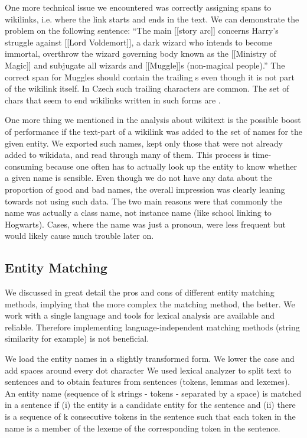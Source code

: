 One more technical issue we encountered was correctly assigning spans to wikilinks, i.e. where the link starts and ends in the text. We can demonstrate the problem on the following sentence: “The main [[story arc]] concerns Harry's struggle against [[Lord Voldemort]], a dark wizard who intends to become immortal, overthrow the wizard governing body known as the [[Ministry of Magic]] and subjugate all wizards and [[Muggle]]s (non-magical people).” The correct span for Muggles should contain the trailing s even though it is not part of the wikilink itself. In Czech such trailing characters are common. The set of chars that seem to end wikilinks written in such forms are . 

One more thing we mentioned in the analysis about wikitext is the possible boost of performance if the text-part of a wikilink was added to the set of names for the given entity. We exported such names, kept only those that were not already added to wikidata, and read through many of them. This process is time-consuming because one often has to actually look up the entity to know whether a given name is sensible. Even though we do not have any data about the proportion of good and bad names, the overall impression was clearly leaning towards not using such data. The two main reasons were that commonly the name was actually a class name, not instance name (like school linking to Hogwarts). Cases, where the name was just a pronoun, were less frequent but would likely cause much trouble later on.

\subsection{Entity Matching}
\label{sec:entity_matching_implementace}
We discussed in great detail the pros and cons of different entity matching methods, implying that the more complex the matching method, the better. We work with a single language and tools for lexical analysis are available and reliable. Therefore implementing language-independent matching methods (string similarity for example) is not beneficial. 

We load the entity names in a slightly transformed form. We lower the case and add spaces around every dot character We used lexical analyzer to split text to sentences and to obtain features from sentences (tokens, lemmas and lexemes). An entity name (sequence of k strings - tokens - separated by a space) is matched in a sentence if (i) the entity is a candidate entity for the sentence and (ii) there is a sequence of k consecutive tokens in the sentence such that each token in the name is a member of the lexeme of the corresponding token in the sentence. 

